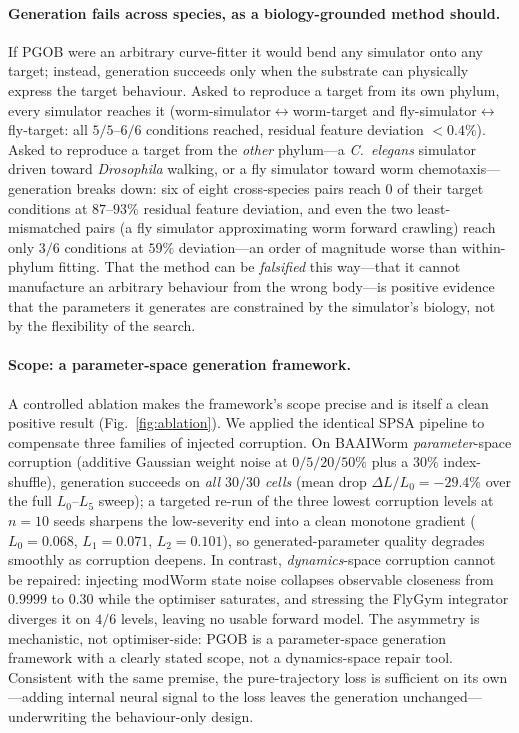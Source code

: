 \documentclass[11pt]{article}
\begin{document}
\paragraph{Generation fails across species, as a biology-grounded method should.} If PGOB were an arbitrary curve-fitter it would bend any simulator onto any target; instead, generation succeeds only when the substrate can physically express the target behaviour. Asked to reproduce a target from its own phylum, every simulator reaches it (worm-simulator$\leftrightarrow$worm-target and fly-simulator$\leftrightarrow$fly-target: all $5/5$--$6/6$ conditions reached, residual feature deviation $<0.4\%$). Asked to reproduce a target from the \emph{other} phylum---a \emph{C.~elegans} simulator driven toward \emph{Drosophila} walking, or a fly simulator toward worm chemotaxis---generation breaks down: six of eight cross-species pairs reach $0$ of their target conditions at $87$--$93\%$ residual feature deviation, and even the two least-mismatched pairs (a fly simulator approximating worm forward crawling) reach only $3/6$ conditions at $59\%$ deviation---an order of magnitude worse than within-phylum fitting. That the method can be \emph{falsified} this way---that it cannot manufacture an arbitrary behaviour from the wrong body---is positive evidence that the parameters it generates are constrained by the simulator's biology, not by the flexibility of the search.

\paragraph{Scope: a parameter-space generation framework.} A controlled ablation makes the framework's scope precise and is itself a clean positive result (Fig.~\ref{fig:ablation}). We applied the identical SPSA pipeline to compensate three families of injected corruption. On BAAIWorm \emph{parameter}-space corruption (additive Gaussian weight noise at $0/5/20/50\%$ plus a $30\%$ index-shuffle), generation succeeds on \emph{all $30/30$ cells} (mean drop $\Delta L/L_0{=}-29.4\%$ over the full $L_0$--$L_5$ sweep); a targeted re-run of the three lowest corruption levels at $n{=}10$ seeds sharpens the low-severity end into a clean monotone gradient ($L_0{=}0.068$, $L_1{=}0.071$, $L_2{=}0.101$), so generated-parameter quality degrades smoothly as corruption deepens. In contrast, \emph{dynamics}-space corruption cannot be repaired: injecting modWorm state noise collapses observable closeness from $0.9999$ to $0.30$ while the optimiser saturates, and stressing the FlyGym integrator diverges it on $4/6$ levels, leaving no usable forward model. The asymmetry is mechanistic, not optimiser-side: PGOB is a parameter-space generation framework with a clearly stated scope, not a dynamics-space repair tool. Consistent with the same premise, the pure-trajectory loss is sufficient on its own---adding internal neural signal to the loss leaves the generation unchanged---underwriting the behaviour-only design.
\end{document}

